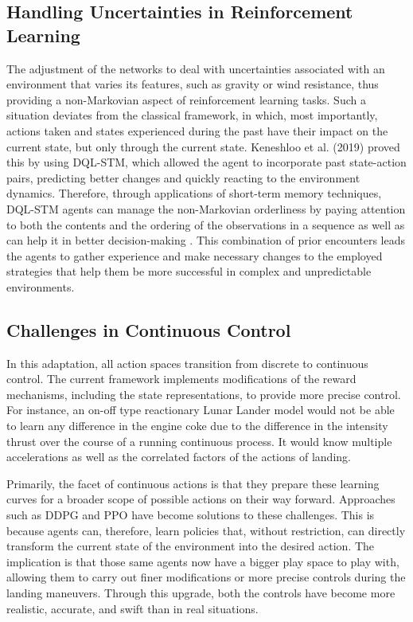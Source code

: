 \documentclass[conference]{IEEEtran}
\begin{document}
\subsection{Handling Uncertainties in Reinforcement Learning}
The adjustment of the networks to deal with uncertainties associated with an environment that varies its features, such as gravity or wind resistance, thus providing a non-Markovian aspect of reinforcement learning tasks. Such a situation deviates from the classical framework, in which, most importantly, actions taken and states experienced during the past have their impact on the current state, but only through the current state. Keneshloo et al. (2019)\cite{keneshloo2019deep} proved this by using DQL-STM, which allowed the agent to incorporate past state-action pairs, predicting better changes and quickly reacting to the environment dynamics. Therefore, through applications of short-term memory techniques, DQL-STM agents can manage the non-Markovian orderliness by paying attention to both the contents and the ordering of the observations in a sequence as well as can help it in better decision-making \cite{guttulsrud2023solving}. This combination of prior encounters leads the agents to gather experience and make necessary changes to the employed strategies that help them be more successful in complex and unpredictable environments.


\subsection{Challenges in Continuous Control}
In this adaptation, all action spaces transition from discrete to continuous control. The current framework implements modifications of the reward mechanisms, including the state representations, to provide more precise control. For instance, an on-off type reactionary Lunar Lander model would not be able to learn any difference in the engine coke due to the difference in the intensity thrust over the course of a running continuous process\cite{elkins2020adaptive}. It would know multiple accelerations as well as the correlated factors of the actions of landing.

Primarily, the facet of continuous actions is that they prepare these learning curves for a broader scope of possible actions on their way forward. Approaches such as DDPG and PPO have become solutions to these challenges. This is because agents can, therefore, learn policies that, without restriction, can directly transform the current state of the environment into the desired action. The implication is that those same agents now have a bigger play space to play with, allowing them to carry out finer modifications or more precise controls during the landing maneuvers\cite{dulac2021challenges}. Through this upgrade, both the controls have become more realistic, accurate, and swift than in real situations.
\end{document}
